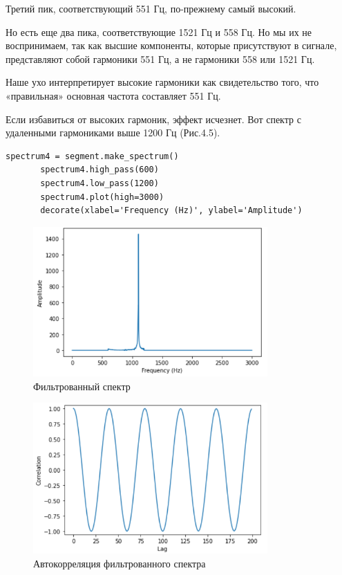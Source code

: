 \documentclass[a4paper,12pt]{report}
\begin{document}
    Третий пик, соответствующий 551 Гц, по-прежнему самый высокий.    
    
    Но есть еще два пика, соответствующие 1521 Гц и 558 Гц. Но мы их не воспринимаем, так как высшие компоненты, которые присутствуют в сигнале, представляют собой гармоники 551 Гц, а не гармоники 558 или 1521 Гц.
    
    Наше ухо интерпретирует высокие гармоники как свидетельство того, что «правильная» основная частота составляет 551 Гц.

    Если избавиться от высоких гармоник, эффект исчезнет. Вот спектр с удаленными гармониками выше 1200 Гц (Рис.4.5).
\begin{lstlisting}[caption=Фильтрация гармоник]
       spectrum4 = segment.make_spectrum()
       spectrum4.high_pass(600)
       spectrum4.low_pass(1200)
       spectrum4.plot(high=3000)
       decorate(xlabel='Frequency (Hz)', ylabel='Amplitude')
\end{lstlisting}
\begin{figure}[H]
        \centering
        \includegraphics[width=0.8\textwidth]{fig4-5.PNG}
        \caption{Фильтрованный спектр}
        \label{fig:fig4-5}
\end{figure}

\begin{figure}[H]
        \centering
        \includegraphics[width=0.8\textwidth]{fig4-6.PNG}
        \caption{Автокорреляция фильтрованного спектра}
        \label{fig:fig4-6}
\end{figure}
\end{document}
